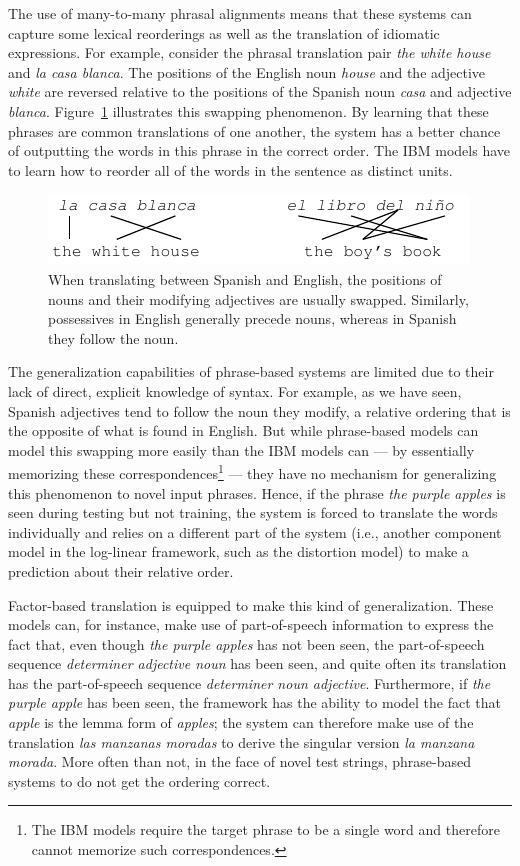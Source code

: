 \documentclass[11pt]{report}
\theoremstyle{plain}
\begin{document}
{The use of many-to-many phrasal alignments means that these systems
can capture some lexical reorderings as well as the translation of
idiomatic expressions.  For example, consider the phrasal translation
pair {\em the white house} and {\em la casa blanca}. The
positions of the English noun {\em house} and the adjective {\em
white} are reversed relative to the positions of the Spanish noun {\em
casa} and adjective {\em blanca}. Figure~\ref{localreorder}
illustrates this swapping phenomenon. By learning that these phrases
are common translations of one another, the system has a better chance
of outputting the words in this phrase in the correct order. The IBM
models have to learn how to reorder all of the words in the sentence
as distinct units.

\begin{figure}
\centering
\includegraphics[scale=1]{brooke-localreorder}
\caption{When translating between Spanish and English, the positions
of nouns and their modifying adjectives are usually
swapped. Similarly, possessives in English generally precede nouns,
whereas in Spanish they follow the noun.}
\label{localreorder}
\end{figure}

The generalization capabilities of phrase-based systems are limited
due to their lack of direct, explicit knowledge of syntax. For
example, as we have seen, Spanish adjectives tend to follow the noun
they modify, a relative ordering that is the opposite of what is found
in English. But while phrase-based models can model this swapping more
easily than the IBM models can --- by essentially memorizing these
correspondences\footnote{The IBM models require the target phrase to
be a single word and therefore cannot memorize such correspondences.}
--- they have no mechanism for generalizing this phenomenon to novel
input phrases. Hence, if the phrase {\em the purple apples} is seen
during testing but not training, the system is forced to translate the
words individually and relies on a different part of the system (i.e.,
another component model in the log-linear framework, such as the
distortion model) to make a prediction about their relative order.

Factor-based translation is equipped to make this kind of
generalization. These models can, for instance, make use of
part-of-speech information to express the fact that, even though {\em
the purple apples} has not been seen, the part-of-speech sequence {\em
determiner adjective noun} has been seen, and quite often its
translation has the part-of-speech sequence {\em determiner noun
adjective}. Furthermore, if {\em the purple apple} has been seen, the
framework has the ability to model the fact that {\em apple} is the
lemma form of {\em apples}; the system can therefore make use of the
translation {\em las manzanas moradas} to derive the singular version
{\em la manzana morada}. More often than not, in the face of novel
test strings, phrase-based systems to do not get the ordering
correct.

}
\end{document}
